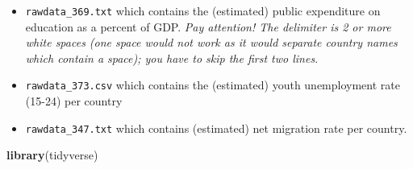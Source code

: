 \documentclass[
]{article}
\newenvironment{Shaded}{\begin{snugshade}}{\end{snugshade}}
\newcommand{\FunctionTok}[1]{\textcolor[rgb]{0.13,0.29,0.53}{\textbf{#1}}}
\newcommand{\NormalTok}[1]{#1}
\begin{document}
\begin{itemize}
\item
  \texttt{rawdata\_369.txt} which contains the (estimated) public
  expenditure on education as a percent of GDP. \emph{Pay attention! The
  delimiter is 2 or more white spaces (one space would not work as it
  would separate country names which contain a space); you have to skip
  the first two lines}.
\item
  \texttt{rawdata\_373.csv} which contains the (estimated) youth
  unemployment rate (15-24) per country
\item
  \texttt{rawdata\_347.txt} which contains (estimated) net migration
  rate per country.
\end{itemize}

\begin{Shaded}
\begin{Highlighting}[]
\FunctionTok{library}\NormalTok{(tidyverse)}
\end{Highlighting}
\end{Shaded}
\end{document}
